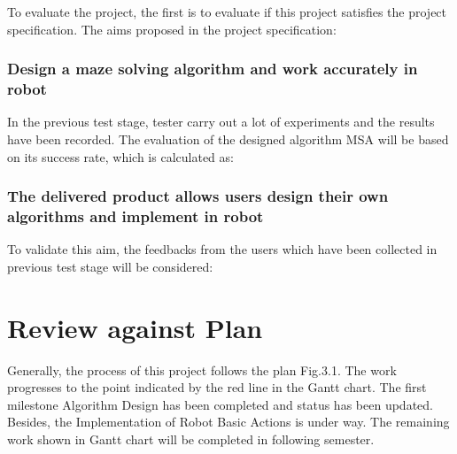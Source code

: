 \documentclass[11pt,times,oneside,openright,hardcopy]{eeereport}
\begin{document}
To evaluate the project, the first is to evaluate if this project satisfies the project specification.
The aims proposed in the project specification:

\subsection{Design a maze solving algorithm and work accurately in robot}
In the previous test stage, tester carry out a lot of experiments and the results have been recorded. The evaluation of the designed algorithm MSA will be based on its success rate, which is calculated as:

\subsection{The delivered product allows users design their own algorithms and implement in robot}
To validate this aim, the feedbacks from the users which have been collected in previous test stage will be considered:

\chapter{Review against Plan}
Generally, the process of this project follows the plan Fig.3.1. The work progresses to the point indicated by the red line in the Gantt chart. The first milestone Algorithm Design has been completed and status has been updated. 
Besides, the Implementation of Robot Basic Actions is under way. The remaining work shown in Gantt chart will be completed in following semester.





\end{document}
